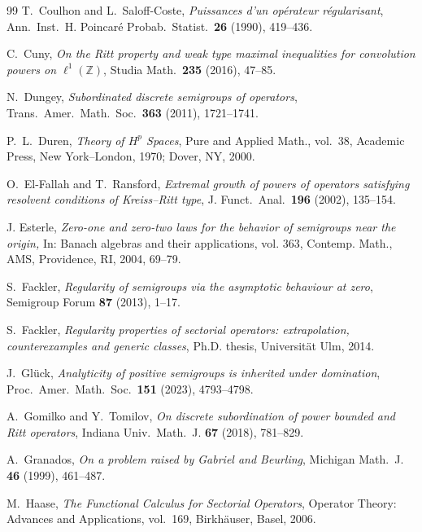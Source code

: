 \documentclass[11pt]{amsart}
\numberwithin{equation}{section}
\theoremstyle{definition}
\theoremstyle{plain}
\begin{document}
\begin{thebibliography}{99}
T.~Coulhon and L.~Saloff-Coste,
\emph{Puissances d'un op\'erateur r\'egularisant},
Ann.\ Inst.\ H. Poincar\'e Probab.\ Statist.\ \textbf{26} (1990), 419--436.

C.~Cuny,
\emph{On the Ritt property and weak type maximal inequalities for convolution powers on $\ell^1(\mathbb Z)$},
Studia Math.\ \textbf{235} (2016), 47--85.

N.~Dungey, 
\emph{Subordinated discrete semigroups of operators},
Trans.\ Amer.\ Math.\ Soc.\ \textbf{363} (2011), 1721--1741.

P.~L.~Duren,
\emph{Theory of $H^p$ Spaces},
Pure and Applied Math., vol.~38, Academic Press, New York--London, 1970; Dover, NY, 2000.

O.~El-Fallah and T.~Ransford,
\emph{Extremal growth of powers of operators satisfying resolvent conditions of Kreiss--Ritt type},
J. Funct.\ Anal.\ \textbf{196} (2002), 135--154.

J. Esterle, \emph{Zero-one and zero-two laws for the behavior of semigroups near the origin,} In: Banach
algebras and their applications, vol. 363, Contemp. Math.,  AMS,
Providence, RI, 2004, 69--79.

S.~Fackler,
\emph{Regularity of semigroups via the asymptotic behaviour at zero},
Semigroup Forum \textbf{87} (2013), 1--17.

S.~Fackler,
\emph{Regularity properties of sectorial operators: extrapolation, counterexamples and generic classes},
Ph.D. thesis, Universit\"at Ulm, 2014.

J.~Gl\"uck,
\emph{Analyticity of positive semigroups is inherited under domination},
Proc.\ Amer.\ Math.\ Soc.\ \textbf{151} (2023), 4793--4798.

A.~Gomilko and Y.~Tomilov,
\emph{On discrete subordination of power bounded and Ritt operators},
Indiana Univ.\ Math.\ J. \textbf{67} (2018), 781--829.

A.~Granados,
\emph{On a problem raised by Gabriel and Beurling},
Michigan Math.\ J. \textbf{46} (1999), 461--487.

M.~Haase, 
\emph{The Functional Calculus for Sectorial Operators},
Operator Theory: Advances and Applications, vol.~169, Birkh\"auser, Basel, 2006.



\end{thebibliography}
\end{document}
